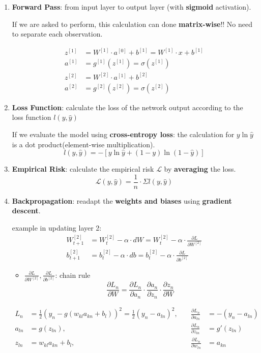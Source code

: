\begin{enumerate}[label= \protect \circled{\arabic*} ]
	\item \textbf{Forward Pass}: from input layer to output layer (with \textbf{sigmoid} activation).
	
	If we are asked to perform, this calculation can done \textbf{matrix-wise}!! No need to separate each observation.
	
	\begin{align*}
		z^{[1]} &= W^{[1]}\cdot a^{[0]} + b^{[1]} =  W^{[1]}\cdot x + b^{[1]}\\
		a^{[1]} &= g^{[1]}(z^{[1]}) = \sigma(z^{[1]}) \\
		z^{[2]} &= W^{[2]}\cdot a^{[1]} + b^{[2]} \\
		a^{[2]} &= g^{[2]}(z^{[2]}) = \sigma(z^{[2]})
	\end{align*}
	
	\item \textbf{Loss Function}: calculate the loss of the network output according to the loss function $l(y, \hat{y})$
	
	If we evaluate the model using \textbf{cross-entropy loss}: the calculation for $y \ln\hat{y}$ is a dot product(element-wise multiplication).
	$$l(y,\hat{y}) = - [y \ln \hat{y} + (1-y)\ln(1 - \hat{y})]$$
	\item \textbf{Empirical Risk}: calculate the empirical risk $\mathcal{L}$ by \textbf{averaging} the loss.
	$$\mathcal{L}(y,\hat{y}) = \frac{1}{n} \cdot \Sigma l(y,\hat{y})$$
	
	\item \textbf{Backpropagation}: readapt the \textbf{weights and biases} using \textbf{gradient descent}. 
	
	example in updating layer 2:
	\begin{align*}
		W^{[2]}_{t+1} &= W^{[2]}_t - \alpha \cdot dW =W^{[2]}_t - \alpha \cdot \frac{\partial L}{\partial W^{[2]}} \\
		b^{[2]}_{t+1} &= b^{[2]}_t - \alpha \cdot db =b^{[2]}_t - \alpha \cdot \frac{\partial L}{\partial b^{[2]}} 
	\end{align*}
	\begin{itemize}
		\item $\frac{\partial L}{\partial W^{[2]}}, \frac{\partial L}{\partial b^{[2]}}$: chain rule
		$$\frac{\partial L_n}{\partial W} = \frac{\partial L_n}{\partial a_{n}} \cdot \frac{\partial a_{n}}{\partial z_{n}} \cdot \frac{\partial z_n}{\partial W}$$
	\end{itemize}
	\begin{align*}
		L_n &= \frac{1}{2} (y_{n} - g(w_{kl}a_{kn} + b_l))^2 = \frac{1}{2} (y_n - a_{ln})^2, \quad &\frac{\partial L_n}{\partial a_{ln}} &= -(y_n - a_{ln})\\
		a_{ln} &= g(z_{ln}) , \quad &\frac{\partial L_n}{\partial z_{ln}} &= g'(z_{ln}) \\
		z_{ln} &= w_{kl}a_{kn} + b_l, \quad &\frac{\partial L_n}{\partial w_{ln}} &= a_{kn} 	
	\end{align*}


\end{enumerate}
